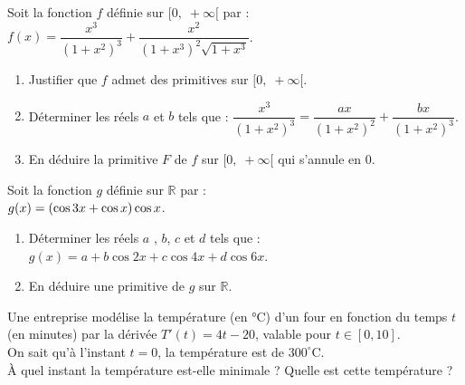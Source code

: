 \begin{exercice}
 Soit la fonction $ f $  définie sur $  [0,\; +\infty[ $  par : \; $ f(x)=\dfrac{x^3}{(1+x^2)^3}+ \dfrac{x^2}{(1+x^3)^2\sqrt{1+x^3}} $.
\begin{enumerate}
\item Justifier que $ f $ admet des primitives sur $  [0,\; +\infty[ $.
\item Déterminer les réels $a $ et $ b$ tels que :\; $ \dfrac{x^3}{(1+x^2)^3}=\dfrac{ax}{(1+x^2)^2}+\dfrac{bx}{(1+x^2)^3} $.
\item En déduire la primitive $ F $ de $ f $  sur $  [0,\; +\infty[ $ qui s'annule en 0.
\end{enumerate}
\end{exercice}
\begin{exercice}
Soit la fonction $ g $  définie sur $ \mathbb{R} $  par : \\ $ g(x)=\left(\cos 3x  +\cos x\right)\cos x $.
\begin{enumerate}
\item Déterminer les réels $a $ , $ b $, $ c $ et $ d$ tels que :\; $ g(x)=a+b\cos 2x +c\cos 4x +d\cos 6x$.
\item En déduire une primitive de $ g $  sur $\mathbb{R} $.  
\end{enumerate}
\end{exercice}



\begin{exercice}
Une entreprise modélise la température (en °C) d’un four en fonction du temps $t$ (en minutes) par la dérivée $T'(t) = 4t - 20$, valable pour $t \in [0, 10]$.\\
On sait  qu’à l’instant $t = 0$, la température est de $300^\circ$C.\\
 À quel instant la température est-elle minimale ? Quelle est cette température ?
  
\end{exercice}
